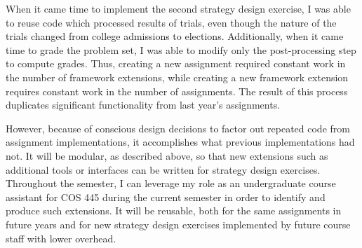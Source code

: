 \documentclass[pageno]{jpaper}
\begin{document}
When it came time to implement the second strategy design exercise, I was able to reuse code which processed results of trials, even though the nature of the trials changed from college admissions to elections.
Additionally, when it came time to grade the problem set, I was able to modify only the post-processing step to compute grades.
Thus, creating a new assignment required constant work in the number of framework extensions, while creating a new framework extension requires constant work in the number of assignments.
The result of this process duplicates significant functionality from last year's assignments.

However, because of conscious design decisions to factor out repeated code from assignment implementations, it accomplishes what previous implementations had not.
It will be modular, as described above, so that new extensions such as additional tools or interfaces can be written for strategy design exercises.
Throughout the semester, I can leverage my role as an undergraduate course assistant for COS 445 during the current semester in order to identify and produce such extensions.
It will be reusable, both for the same assignments in future years and for new strategy design exercises implemented by future course staff with lower overhead.
\end{document}
